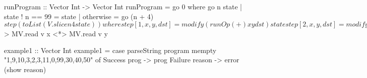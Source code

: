 \nwendcode{}\nwdocspar

\nwenddocs{}\plusendmoddef\nwstartdeflinemarkup{}\nwenddeflinemarkup
runProgram :: Vector Int -> Vector Int
runProgram = go 0
  where
    go n state
      | state ! n == 99 = state
      | otherwise       = go (n + 4) $ step (toList (V.slice n 4 state))
      where
        step [1, x, y, dst] = modify (runOp (+) x y dst) state
        step [2, x, y, dst] = modify (runOp (*) x y dst) state
        step _              = state

    runOp f x y dst v = write v dst =<< f <$> MV.read v x <*> MV.read v y


\nwendcode{}\nwdocspar

\nwenddocs{}\plusendmoddef\nwstartdeflinemarkup{}\nwenddeflinemarkup
example1 :: Vector Int
example1 =
    case parseString program mempty "1,9,10,3,2,3,11,0,99,30,40,50" of
      Success prog   -> prog
      Failure reason -> error (show reason)
\nwendcode{}\nwdocspar
\nwenddocs{}

%
%


